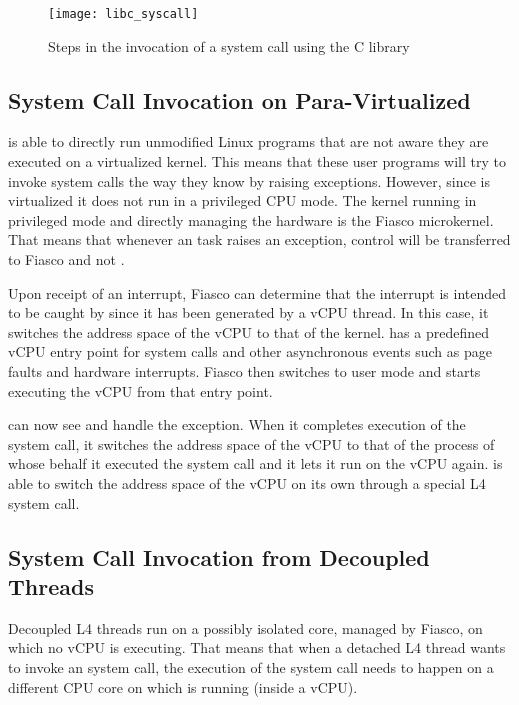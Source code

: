 \begin{figure}[h]
\centering
\texttt{[image: libc\_syscall]}
\caption{Steps in the invocation of a system call using the C library}
\label{fig:libc_syscall}
\end{figure}

\subsection{System Call Invocation on Para-Virtualized \llinux}

\llinux is able to directly run unmodified Linux programs that are not aware
they are executed on a virtualized kernel. This means that these user programs
will try to invoke \llinux system calls the way they know by raising
exceptions. However, since \llinux is virtualized it does not run in a
privileged CPU mode. The kernel running in privileged mode and directly
managing the hardware is the Fiasco microkernel. That means that whenever an
\llinux task raises an exception, control will be transferred to Fiasco and not
\llinux.

Upon receipt of an interrupt, Fiasco can determine that the interrupt is
intended to be caught by \llinux since it has been generated by a vCPU thread.
In this case, it switches the address space of the vCPU to that of the \llinux
kernel. \llinux has a predefined vCPU entry point for system calls and other
asynchronous events such as page faults and hardware interrupts. Fiasco then
switches to user mode and starts executing the vCPU from that entry point.

\llinux can now see and handle the exception. When it completes execution of
the system call, it switches the address space of the vCPU to that of the
process of whose behalf it executed the system call and it lets it run on the
vCPU again. \llinux is able to switch the address space of the vCPU on its own
through a special L4 system call.

\subsection{System Call Invocation from Decoupled Threads}
\label{sec:syscall_forwarding}

Decoupled L4 threads run on a possibly isolated core, managed by Fiasco, on
which no vCPU is executing. That means that when a detached L4 thread wants to
invoke an \llinux system call, the execution of the system call needs to happen
on a different CPU core on which \llinux is running (inside a vCPU).

